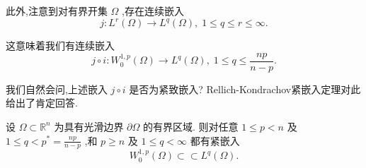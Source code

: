 \documentclass[lang=cn,newtx,10pt,scheme=chinese,thmcnt=chapter]{elegantbook}
\begin{document}
此外,注意到对有界开集 \(\Omega\) ,存在连续嵌入
\begin{equation}
j : {L}^{r}\left( \Omega \right)  \rightarrow  {L}^{q}\left( \Omega \right) ,\;1 \leqslant  q \leqslant  r \leqslant  \infty . \label{3.44}
\end{equation}

这意味着我们有连续嵌入
\begin{equation*}
j \circ  i : {W}_{0}^{1,p}\left( \Omega \right)  \rightarrow  {L}^{q}\left( \Omega \right) ,\;1 \leqslant  q \leqslant  \frac{np}{n - p}.
\end{equation*}

我们自然会问,上述嵌入 \(j \circ  i\) 是否为紧致嵌入? Rellich-Kondrachov紧嵌入定理对此给出了肯定回答.
\begin{theorem}
      设 \(\Omega  \subset  {\mathbb{R}}^{n}\) 为具有光滑边界 \(\partial \Omega\) 的有界区域. 则对任意 \(1 \leqslant  p < n\) 及 \(1 \leqslant  q < {p}^{ * } = \frac{np}{n - p}\) ,和 \(p \geq  n\) 及 \(1 \leqslant  q < \infty\) 都有紧嵌入
\begin{equation*}
{W}_{0}^{1,p}\left( \Omega \right)  \subset   \subset  {L}^{q}\left( \Omega \right) .
\end{equation*}

\end{theorem}
\end{document}
